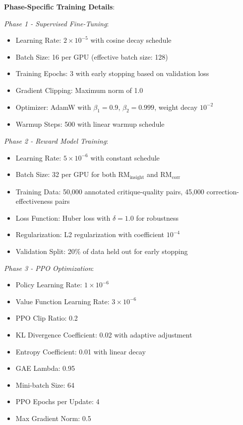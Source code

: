 \documentclass[10pt,twocolumn]{article}
\newcommand{\RMinsight}{\text{RM}_{\text{insight}}}
\newcommand{\RMcorr}{\text{RM}_{\text{corr}}}
\begin{document}
\textbf{Phase-Specific Training Details}:

\textit{Phase 1 - Supervised Fine-Tuning}:
\begin{itemize}[leftmargin=*]
\item Learning Rate: $2 \times 10^{-5}$ with cosine decay schedule
\item Batch Size: 16 per GPU (effective batch size: 128)
\item Training Epochs: 3 with early stopping based on validation loss
\item Gradient Clipping: Maximum norm of 1.0
\item Optimizer: AdamW with $\beta_1 = 0.9$, $\beta_2 = 0.999$, weight decay $10^{-2}$
\item Warmup Steps: 500 with linear warmup schedule
\end{itemize}

\textit{Phase 2 - Reward Model Training}:
\begin{itemize}[leftmargin=*]
\item Learning Rate: $5 \times 10^{-6}$ with constant schedule
\item Batch Size: 32 per GPU for both $\RMinsight$ and $\RMcorr$
\item Training Data: 50,000 annotated critique-quality pairs, 45,000 correction-effectiveness pairs
\item Loss Function: Huber loss with $\delta = 1.0$ for robustness
\item Regularization: L2 regularization with coefficient $10^{-4}$
\item Validation Split: 20\% of data held out for early stopping
\end{itemize}

\textit{Phase 3 - PPO Optimization}:
\begin{itemize}[leftmargin=*]
\item Policy Learning Rate: $1 \times 10^{-6}$
\item Value Function Learning Rate: $3 \times 10^{-6}$
\item PPO Clip Ratio: 0.2
\item KL Divergence Coefficient: 0.02 with adaptive adjustment
\item Entropy Coefficient: 0.01 with linear decay
\item GAE Lambda: 0.95
\item Mini-batch Size: 64
\item PPO Epochs per Update: 4
\item Max Gradient Norm: 0.5
\end{itemize}
\end{document}
